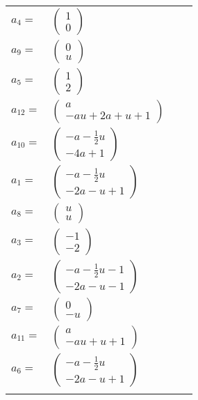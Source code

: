 \documentclass[1p]{elsarticle_modified}
\theoremstyle{definition}
\begin{document}
\begin{tabular}{m{7pt} m{180pt} m{7pt} m{180pt} }
\flushright $a_{4}=$&$\begin{pmatrix}1\\0\end{pmatrix}$ \\
\flushright $a_{9}=$&$\begin{pmatrix}0\\u\end{pmatrix}$ \\
\flushright $a_{5}=$&$\begin{pmatrix}1\\2\end{pmatrix}$ \\
\flushright $a_{12}=$&$\begin{pmatrix}a\\- a u+2 a+u+1\end{pmatrix}$ \\
\flushright $a_{10}=$&$\begin{pmatrix}- a-\frac{1}{2} u\\-4 a+1\end{pmatrix}$ \\
\flushright $a_{1}=$&$\begin{pmatrix}- a-\frac{1}{2} u\\-2 a- u+1\end{pmatrix}$ \\
\flushright $a_{8}=$&$\begin{pmatrix}u\\u\end{pmatrix}$ \\
\flushright $a_{3}=$&$\begin{pmatrix}-1\\-2\end{pmatrix}$ \\
\flushright $a_{2}=$&$\begin{pmatrix}- a-\frac{1}{2} u-1\\-2 a- u-1\end{pmatrix}$ \\
\flushright $a_{7}=$&$\begin{pmatrix}0\\- u\end{pmatrix}$ \\
\flushright $a_{11}=$&$\begin{pmatrix}a\\- a u+u+1\end{pmatrix}$ \\
\flushright $a_{6}=$&$\begin{pmatrix}- a-\frac{1}{2} u\\-2 a- u+1\end{pmatrix}$\\&\end{tabular}
\end{document}
